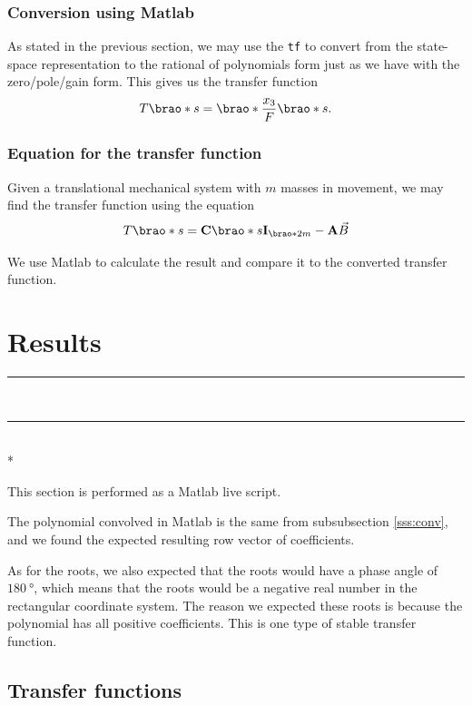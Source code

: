 \documentclass[12pt]{article}
\DeclarePairedDelimiter\brao()%
\def\hr{{\par\noindent\rule{\textwidth}{0.4pt}}}
\begin{document}
\subsubsection{Conversion using Matlab}

As stated in the previous section,
we may use the \texttt{tf} to convert from the state-space representation to the rational of polynomials form
just as we have with the zero/pole/gain form.
This gives us the transfer function
\begin{equation}
    T\brao*s = \brao*{\frac{x_3}{F}}\brao*s.
\end{equation}

\subsubsection{Equation for the transfer function}

Given a translational mechanical system with $m$ masses in movement,
we may find the transfer function using the equation
\begin{equation}
    T\brao*s = \mathbf{C}\brao*{s\mathbf{I}_{\brao*{2m}} - \mathbf{A}}\vec{B}
\end{equation}

We use Matlab to calculate the result and compare it to the converted transfer function.

\section{Results}

\hr



\ \hr \\*

This section is performed as a Matlab live script.

The polynomial convolved in Matlab is the same from subsubsection \ref{sss:conv}, and we found the expected resulting row vector of coefficients.

As for the roots, we also expected that the roots would have a phase angle of $\SI{180}\degree$,
which means that the roots would be a negative real number in the rectangular coordinate system.
The reason we expected these roots is because the polynomial has all positive coefficients.
This is one type of stable transfer function.

\subsection{Transfer functions}
\end{document}
